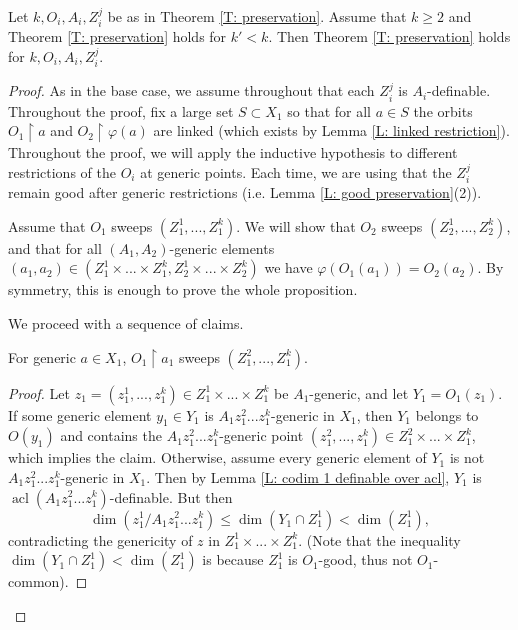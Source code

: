 \documentclass[10pt,a4paper]{amsart}
\begin{document}
\begin{proposition}\label{P: preservation inductive step}
    Let $k,O_i,A_i,Z_i^j$ be as in Theorem \ref{T: preservation}. Assume that $k\geq 2$ and Theorem \ref{T: preservation} holds for $k'<k$. Then Theorem \ref{T: preservation} holds for $k,O_i,A_i,Z_i^j$.
\end{proposition}

\begin{proof}
    As in the base case, we assume throughout that each $Z_i^j$ is $A_i$-definable. Throughout the proof, fix a large set $S\subset X_1$ so that for all $a\in S$ the orbits $O_1\restriction a$ and $O_2\restriction\varphi(a)$ are linked (which exists by Lemma \ref{L: linked restriction}). Throughout the proof, we will apply the inductive hypothesis to different restrictions of the $O_i$ at generic points. Each time, we are using that the $Z_i^j$ remain good after generic restrictions (i.e. Lemma \ref{L: good preservation}(2)).
    
    Assume that $O_1$ sweeps $(Z_1^1,...,Z_1^k)$. We will show that $O_2$ sweeps $(Z_2^1,...,Z_2^k)$, and that for all $(A_1,A_2)$-generic elements $(a_1,a_2)\in(Z_1^1\times...\times Z_1^k,Z_2^1\times...\times Z_2^k)$ we have $\varphi(O_1(a_1))=O_2(a_2)$. By symmetry, this is enough to prove the whole proposition.

    We proceed with a sequence of claims.

    \begin{claim}\label{Cl: preservation inductive step claim 1} For generic $a\in X_1$, $O_1\restriction a_1$ sweeps $(Z_1^2,...,Z_1^k)$.
    \end{claim}
    \begin{proof}
        Let $z_1=(z_1^1,...,z_1^k)\in Z_1^1\times...\times Z_1^k$ be $A_1$-generic, and let $Y_1=O_1(z_1)$. If some generic element $y_1\in Y_1$ is $A_1z_1^2...z_1^k$-generic in $X_1$, then $Y_1$ belongs to $O(y_1)$ and contains the $A_1z_1^2...z_1^k$-generic point $(z_1^2,...,z_1^k)\in Z_1^2\times...\times Z_1^k$, which implies the claim. Otherwise, assume every generic element of $Y_1$ is not $A_1z_1^2...z_1^k$-generic in $X_1$. Then by Lemma \ref{L: codim 1 definable over acl}, $Y_1$ is $\operatorname{acl}(A_1z_1^2...z_1^k)$-definable. But then $$\dim(z_1^1/A_1z_1^2...z_1^k)\leq\dim(Y_1\cap Z_1^1)<\dim(Z_1^1),$$ contradicting the genericity of $z$ in $Z_1^1\times...\times Z_1^k$. (Note that the inequality $\dim(Y_1\cap Z_1^1)<\dim(Z_1^1)$ is because $Z_1^1$ is $O_1$-good, thus not $O_1$-common). 
    \end{proof}


\end{proof}
\end{document}
